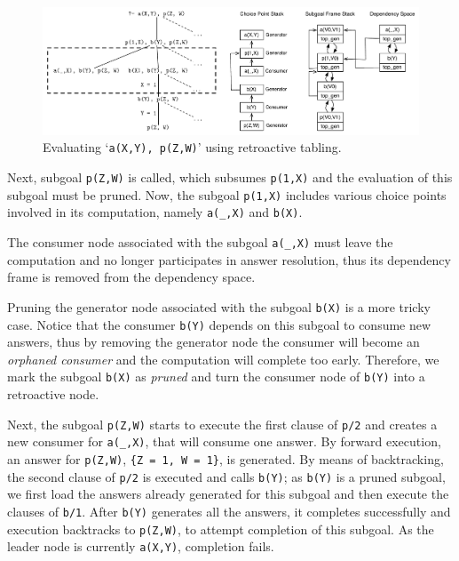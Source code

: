 \begin{figure}[ht]
  \centering
    \includegraphics[scale=0.5]{retro_example2.pdf}
  \caption{Evaluating `\texttt{a(X,Y),~p(Z,W)}' using retroactive tabling.}
  \label{fig:retro_eval2}
\end{figure}

Next, subgoal \texttt{p(Z,W)} is called, which subsumes \texttt{p(1,X)} and the evaluation of this subgoal
must be pruned. Now, the subgoal \texttt{p(1,X)} includes various choice points involved in its computation,
namely \texttt{a(\_,X)} and \texttt{b(X)}.

The consumer node associated with the subgoal \texttt{a(\_,X)} must leave the computation and no longer
participates in answer resolution, thus its dependency frame is removed from the dependency space.

Pruning the generator node associated with the subgoal \texttt{b(X)} is a more tricky case. Notice that
the consumer \texttt{b(Y)} depends on this subgoal to consume new answers, thus by removing the generator node
the consumer will become an \textit{orphaned consumer} and the computation will complete too early.
Therefore, we mark the subgoal \texttt{b(X)} as \textit{pruned} and turn the consumer node of \texttt{b(Y)}
into a retroactive node.

Next, the subgoal \texttt{p(Z,W)} starts to execute the first clause of \texttt{p/2} and creates
a new consumer for \texttt{a(\_,X)}, that will consume one answer. By forward execution, an answer
for \texttt{p(Z,W)}, \texttt{\{Z~=~1,~W~=~1\}}, is generated. By means of backtracking, the second
clause of \texttt{p/2} is executed and calls \texttt{b(Y)}; as \texttt{b(Y)} is a pruned subgoal,
we first load the answers already generated for this subgoal and then execute the clauses of \texttt{b/1}.
After \texttt{b(Y)} generates all the answers, it completes successfully and execution backtracks to
\texttt{p(Z,W)}, to attempt completion of this subgoal. As the leader node is currently \texttt{a(X,Y)},
completion fails.

